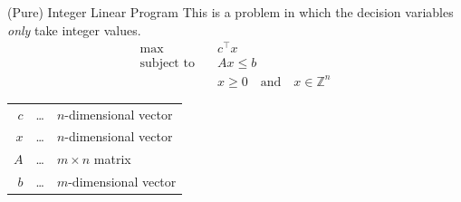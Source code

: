 \documentclass[a4paper, 11pt]{report}
\begin{document}
\begin{defframe}{(Pure) Integer Linear Program}{}
    This is a problem in which the decision variables \textit{only} take integer values.
\begin{align*}
  \max \quad & c^\top x \\
  \text{subject to} \quad & Ax \le b \\
  & x \ge 0 \quad \text{and} \quad x \in \mathbb{Z}^n
\end{align*}

\begin{tabular}{r c l}
  $c$ & \dots & $n$-dimensional vector \\
  $x$ & \dots & $n$-dimensional vector \\
  $A$ & \dots & $m \times n$ matrix \\
  $b$ & \dots & $m$-dimensional vector
\end{tabular}
    
\end{defframe}
\end{document}
